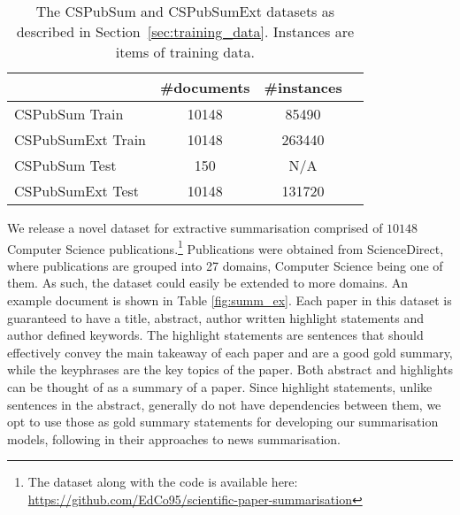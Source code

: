 \documentclass[11pt,a4paper]{article}
\begin{document}
\setlength{\tabcolsep}{0.3em}
\begin{table}[t]
\fontsize{10}{12}\selectfont
\begin{center}
\begin{tabular}{l c c c}
\toprule
& \bf \#documents & \bf \#instances \\
\midrule
CSPubSum Train & 10148 & 85490 \\ %
CSPubSumExt Train & 10148 & 263440 \\
CSPubSum Test & 150 & N/A \\ %
CSPubSumExt Test & 10148 & 131720 \\
\bottomrule
\end{tabular}
\end{center}
\caption{\label{tab:Dataset} The CSPubSum and CSPubSumExt datasets as described in Section~\ref{sec:training_data}. Instances are items of training data.
}
\end{table}

We release a novel dataset for extractive summarisation comprised of $10 148$ Computer Science publications.\footnote{The dataset along with the code is available here: \url{https://github.com/EdCo95/scientific-paper-summarisation}} Publications were obtained from ScienceDirect, where publications are grouped into 27 domains, Computer Science being one of them. As such, the dataset could easily be extended to more domains. %
An example document is shown in Table \ref{fig:summ_ex}.
Each paper in this dataset is guaranteed to have a title, abstract, author written highlight statements and author defined keywords. The highlight statements are sentences that should effectively convey the main takeaway of each paper and are a good gold summary, while the keyphrases are the key topics of the paper.
Both abstract and highlights can be thought of as a summary of a paper. Since highlight statements, unlike sentences in the abstract, generally do not have dependencies between them, we opt to use those as gold summary statements for developing our summarisation models, following  in their approaches to news summarisation.
\end{document}
